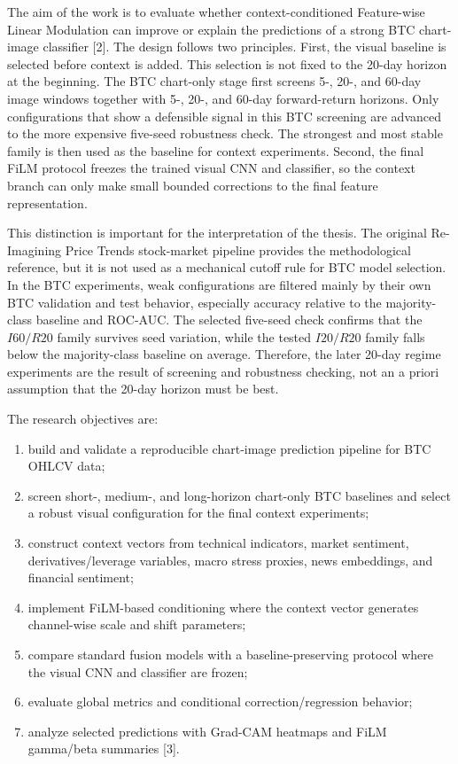 \documentclass[14pt,a4paper]{extarticle}
\begin{document}
The aim of the work is to evaluate whether context-conditioned Feature-wise Linear Modulation can improve or explain the predictions of a strong BTC chart-image classifier [2]. The design follows two principles. First, the visual baseline is selected before context is added. This selection is not fixed to the 20-day horizon at the beginning. The BTC chart-only stage first screens 5-, 20-, and 60-day image windows together with 5-, 20-, and 60-day forward-return horizons. Only configurations that show a defensible signal in this BTC screening are advanced to the more expensive five-seed robustness check. The strongest and most stable family is then used as the baseline for context experiments. Second, the final FiLM protocol freezes the trained visual CNN and classifier, so the context branch can only make small bounded corrections to the final feature representation.

This distinction is important for the interpretation of the thesis. The original Re-Imagining Price Trends stock-market pipeline provides the methodological reference, but it is not used as a mechanical cutoff rule for BTC model selection. In the BTC experiments, weak configurations are filtered mainly by their own BTC validation and test behavior, especially accuracy relative to the majority-class baseline and ROC-AUC. The selected five-seed check confirms that the $I60/R20$ family survives seed variation, while the tested $I20/R20$ family falls below the majority-class baseline on average. Therefore, the later 20-day regime experiments are the result of screening and robustness checking, not an a priori assumption that the 20-day horizon must be best.

The research objectives are:
\begin{enumerate}
\item build and validate a reproducible chart-image prediction pipeline for BTC OHLCV data;
\item screen short-, medium-, and long-horizon chart-only BTC baselines and select a robust visual configuration for the final context experiments;
\item construct context vectors from technical indicators, market sentiment, derivatives/leverage variables, macro stress proxies, news embeddings, and financial sentiment;
\item implement FiLM-based conditioning where the context vector generates channel-wise scale and shift parameters;
\item compare standard fusion models with a baseline-preserving protocol where the visual CNN and classifier are frozen;
\item evaluate global metrics and conditional correction/regression behavior;
\item analyze selected predictions with Grad-CAM heatmaps and FiLM gamma/beta summaries [3].
\end{enumerate}
\end{document}
